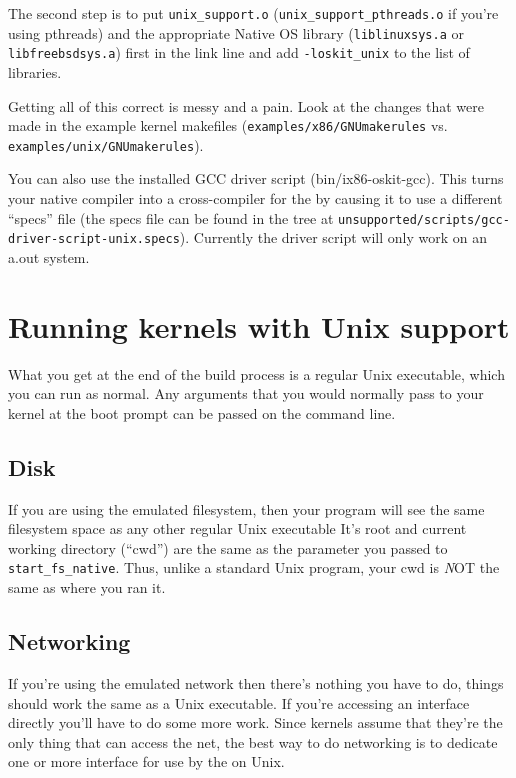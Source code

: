 The second step is to put {\tt unix_support.o}
({\tt unix_support_pthreads.o} if you're using pthreads) and the appropriate
Native OS library ({\tt liblinuxsys.a} or {\tt libfreebsdsys.a}) first
in the link line and add {\tt -loskit_unix} to the list of libraries.  

Getting all of this correct is messy and a pain.  Look at the changes
that were made in the example kernel makefiles
({\tt examples/x86/GNUmakerules} vs. {\tt examples/unix/GNUmakerules}).

You can also use the installed GCC driver script
(bin/ix86-oskit-gcc).  This turns your native compiler into a
cross-compiler for the \oskit{} by causing it to use a different ``specs''
file (the specs file can be found in the \oskit{} tree at
{\tt unsupported/scripts/gcc-driver-script-unix.specs}).  Currently the
driver script will only work on an a.out system.


\section{Running \oskit{} kernels with Unix support}

What you get at the end of the build process is a regular Unix executable,
which you can run as normal.  Any arguments that you would normally
pass to your \oskit{} kernel at the boot prompt can be passed on the
command line.


\subsection{Disk}

If you are using the emulated filesystem, then your \oskit{} program will
see the same filesystem space as any other regular Unix executable
It's root and current working directory (``cwd'') are the same as the
parameter you passed to {\tt start_fs_native}.
Thus, unlike a standard Unix program, your cwd is
{\emph NOT} the same as where you ran it.


\subsection{Networking}
\label{subsec:running:network}

If you're using the emulated network then there's nothing you have to
do, things should work the same as a Unix executable.  If you're
accessing an interface directly you'll have to do some more work.
Since \oskit{} kernels assume that they're the only thing that can access
the net, the best way to do networking is to dedicate one or more interface
for use by the \oskit{} on Unix.

